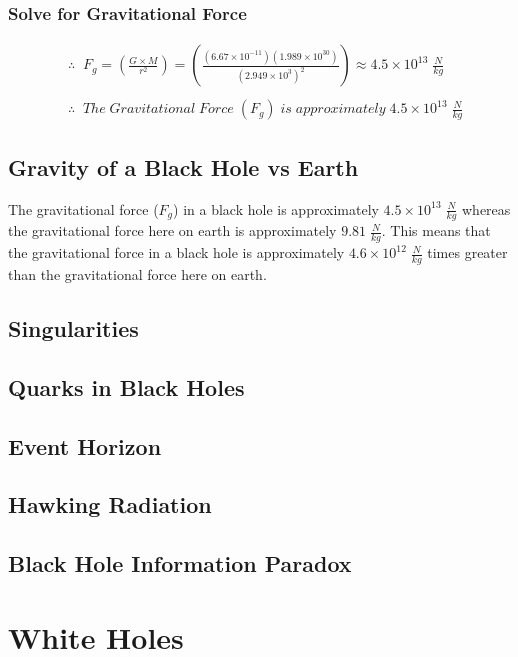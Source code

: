 \documentclass{article}
\begin{document}
\subsubsection{Solve for Gravitational Force}
\begin{align*}
     & \therefore\;\; F_g = \left(\frac{G\times M}{r^2}\right) = \left(\frac{(6.67 \times 10^{-11})(1.989\times 10^{30})}{(2.949 \times 10^{3})^2}\right) \approx 4.5 \times 10^{13} \;\frac{N}{kg} \\\\
     & \therefore\;\; The\; Gravitational\; Force\; (F_g)\; is\; approximately\; 4.5 \times 10^{13} \;\frac{N}{kg}
\end{align*}

\subsection{Gravity of a Black Hole vs Earth}
The gravitational force ($F_g$) in a black hole is approximately $4.5 \times 10^{13}\; \frac{N}{kg}$ whereas the gravitational force here on earth is approximately $9.81\; \frac{N}{kg}$. This means that the gravitational force in a black hole is approximately $4.6 \times 10^{12}\; \frac{N}{kg}$ times greater than the gravitational force here on earth.

\subsection{Singularities}


\subsection{Quarks in Black Holes}


\subsection{Event Horizon}


\subsection{Hawking Radiation}


\subsection{Black Hole Information Paradox}




\section{White Holes}
\end{document}
